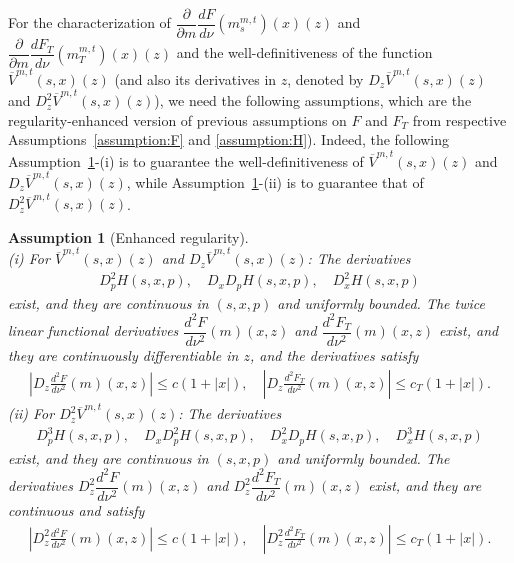 \documentclass[11pt]{article}
\numberwithin{equation}{section}
\newtheorem{assumption}{Assumption}[section]
\newcommand{\pr}{\mathcal{P}}
\newcommand{\brn}{{\mathbb{R}^n}}
\newcommand{\1}{\mbox{1\hspace{-1mm}I}}
\begin{document}
For the characterization of $\dfrac{\partial}{\partial m}\dfrac{dF}{d\nu}\left(m^{m,t}_s\right)(x)(z)$ and $\dfrac{\partial}{\partial m}\dfrac{dF_{T}}{d\nu}\left(m^{m,t}_T\right)(x)(z)$ and the well-definitiveness of the function $\overline{V}^{m,t}(s,x)(z)$ (and also its derivatives in $z$, denoted by $D_z\overline{V}^{m,t}(s,x)(z)$ and $D_z^2\overline{V}^{m,t}(s,x)(z)$), we need the following assumptions, which are the regularity-enhanced version of previous assumptions on $F$ and $F_T$ from respective Assumptions~\ref{assumption:F} and \ref{assumption:H}). Indeed, the following Assumption~\ref{assumption:regularity}-(i) is to guarantee the well-definitiveness of $\overline{V}^{m,t}(s,x)(z)$ and $D_z\overline{V}^{m,t}(s,x)(z)$, while Assumption~\ref{assumption:regularity}-(ii) is to guarantee that of $D_z^2 \overline{V}^{m,t}(s,x)(z)$.

\begin{assumption}[Enhanced regularity]\label{assumption:regularity}
\text{ }\\
(i) For $\overline{V}^{m,t}(s,x)(z)$ and $D_z\overline{V}^{m,t}(s,x)(z)$: The derivatives
\begin{align*}
    D_{p}^{2}H(s,x,p),\quad D_xD_{p}H(s,x,p),\quad D_{x}^{2}H(s,x,p)
\end{align*}
exist, and they are continuous in $(s,x,p)$ and uniformly bounded. The twice linear functional derivatives $\dfrac{d^{2}F}{d\nu^{2}}(m)(x,z)$ and $\dfrac{d^{2}F_T}{d\nu^{2}}(m)(x,z)$ exist, and they are continuously differentiable in $z$, and the derivatives satisfy
\begin{align*}
    \left|D_z\frac{d^2F}{d\nu^2}(m)(x,z)\right| \le c (1+|x|),\quad \left|D_z\frac{d^2F_T}{d\nu^2}(m)(x,z)\right| \le c_T (1+|x|). %
\end{align*}
(ii) For $D_z^2 \overline{V}^{m,t}(s,x)(z)$: The derivatives 
\begin{align*}
    D_{p}^{3}H(s,x,p),\quad D_xD_{p}^{2}H(s,x,p),\quad D_x^2 D_{p}H(s,x,p),\quad D_x^3 H(s,x,p)
\end{align*}
exist, and they are continuous in $(s,x,p)$ and uniformly bounded. The derivatives $D_z^2\dfrac{d^{2}F}{d\nu^{2}}(m)(x,z)$ and $D_z^2\dfrac{d^{2}F_T}{d\nu^{2}}(m)(x,z)$ exist, and they are continuous and satisfy 
\begin{align*}
    \left|D_z^2\frac{d^2F}{d\nu^2}(m)(x,z)\right| \le c (1+|x|),\quad \left|D_z^2\frac{d^2F_T}{d\nu^2}(m)(x,z)\right| \le c_T (1+|x|). %
\end{align*}
\end{assumption}
\end{document}
